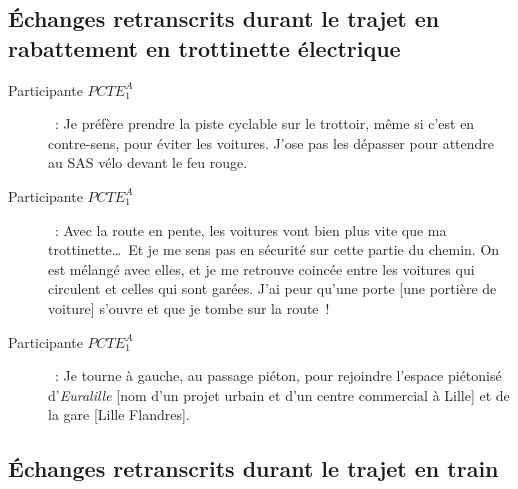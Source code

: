 \subsection{Échanges retranscrits durant le trajet en rabattement en trottinette électrique}
 
\begin{description}%
    \item[Participante \(PCTE^{A}_{1}\)]~: Je préfère prendre la piste cyclable sur le trottoir, même si c'est en contre-sens, pour éviter les voitures. J'ose pas les dépasser pour attendre au SAS vélo devant le feu rouge.
    \item[Participante \(PCTE^{A}_{1}\)]~: Avec la route en pente, les voitures vont bien plus vite que ma trottinette\dots~Et je me sens pas en sécurité sur cette partie du chemin. On est mélangé avec elles, et je me retrouve coincée entre les voitures qui circulent et celles qui sont garées. J'ai peur qu'une porte [une portière de voiture] s'ouvre et que je tombe sur la route~!
    \item[Participante \(PCTE^{A}_{1}\)]~: Je tourne à gauche, au passage piéton, pour rejoindre l'espace piétonisé d'\textsl{Euralille} [nom d'un projet urbain et d'un centre commercial à Lille] et de la gare [Lille Flandres].
\end{description}

\subsection{Échanges retranscrits durant le trajet en train}

